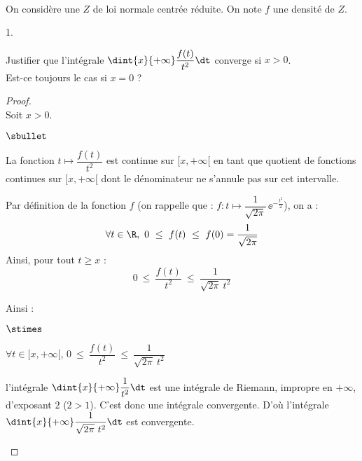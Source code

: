 \documentclass[11pt]{article}%
\begin{document}
\begin{exerciceSP}~\\
  On considère une \var $Z$ de loi normale centrée réduite. On note
  $f$ une densité de $Z$.
  \begin{noliste}{1.}
  \item Justifier que l'intégrale $\dint{x}{+\infty} \dfrac{f(t)}{t^2}
    \dt$ converge si $x>0$.\\
    Est-ce toujours le cas si $x=0$ ?

    \begin{proof}~\\
      Soit $x>0$.
      \begin{noliste}{$\sbullet$}
      \item La fonction $t \mapsto \dfrac{f(t)}{t^2}$ est continue sur
        $[x, +\infty[$ en tant que quotient de fonctions continues sur
        $[x, +\infty[$ dont le dénominateur ne s'annule pas sur cet intervalle.
        
      \item Par définition de la fonction $f$ (on rappelle que : $f :
        t \mapsto \dfrac{1}{\sqrt{2 \pi}} \, \ee^{-\frac{t^2}{2}}$),
        on a : 
        \[
          \forall t \in \R, \ 0 \ \leq \ f(t) \ \leq \ f(0) = \dfrac{1}{\sqrt{2 \pi}}
        \]
        Ainsi, pour tout $t \geq x$ :
        \[
          0 \ \leq \ \dfrac{f(t)}{t^2} \ \leq \ \dfrac{1}{\sqrt{2 \pi}
            \ t^2}
        \]
        
      \item Ainsi : 
        \begin{noliste}{$\stimes$}
        \item $\forall t \in [x, +\infty[$, $0 \ \leq \
          \dfrac{f(t)}{t^2} \ \leq \ \dfrac{1}{\sqrt{2 \pi} \ t^2}$
          
        \item l'intégrale $\dint{x}{+\infty} \dfrac{1}{t^2} \dt$ est
          une intégrale de Riemann, impropre en $+\infty$, d'exposant
          $2$ ($2>1$). C'est donc une intégrale convergente. D'où
          l'intégrale $\dint{x}{+\infty} \dfrac{1}{\sqrt{2 \pi} \ t^2}
          \dt$ est convergente.
        \end{noliste}


        \newpage


\end{noliste}
\end{proof}
\end{noliste}
\end{exerciceSP}
\end{document}
